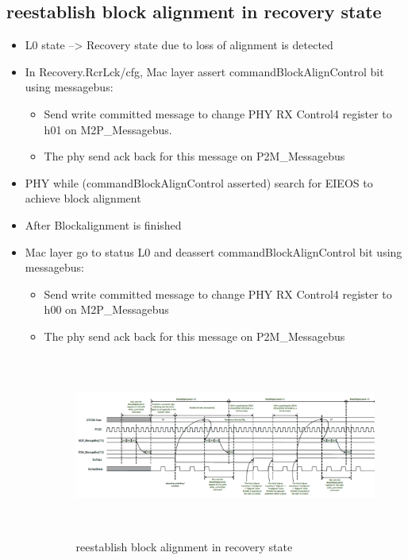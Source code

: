 \subsection{reestablish block alignment in recovery state} 
\begin{itemize}
    \item L0 state --> Recovery state due to loss of alignment is detected

    \item In Recovery.RcrLck/cfg, Mac layer assert commandBlockAlignControl bit using messagebus:
\begin{itemize}
    \item Send write committed message to change PHY RX Control4 register to h01 on M2P\_Messagebus.
    \item The phy send ack back for this message on P2M\_Messagebus

    
\end{itemize}
    \item PHY while (commandBlockAlignControl asserted) search for EIEOS to achieve
   block alignment

    \item After Blockalignment is finished

    \item Mac layer go to status L0 and deassert commandBlockAlignControl bit using messagebus:
\begin{itemize}
    \item Send write committed message to change PHY RX Control4 register to h00 on M2P\_Messagebus
\item The phy send ack back for this message on P2M\_Messagebus

\begin{figure}[H]
  \centering
  \includegraphics[width=130mm,height=60mm]{images/clk_diagram/recovery.png}
  \caption{reestablish block alignment in recovery state}
  \label{lane}
\end{figure}
\end{itemize}
\end{itemize}
